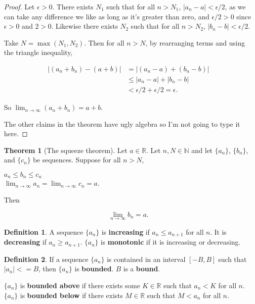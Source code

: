 \documentclass{article}
\theoremstyle{definition}
\newtheorem{definition}{Definition}[section]
\newtheorem{theorem}{Theorem}[section]
\begin{document}
\begin{proof}
Let $\epsilon > 0$. There exists $N_1$ such that for all $n > N_1$, $|a_n - a| < \epsilon/2$, as we can take any difference we like as long as it's greater than zero, and $\epsilon/2 > 0$ since $\epsilon > 0$ and $2 > 0$. Likewise there exists $N_2$ such that for all $n > N_2$, $|b_n - b| < \epsilon/2$.

Take $N = \max(N_1, N_2)$. Then for all $n > N$, by rearranging terms and using the triangle inequality,

\begin{align}
|(a_n + b_n) - (a+b)| & =  |(a_n - a) + (b_n - b)| \\
& \leq  |a_n - a| + |b_n - b| \\
& <  \epsilon/2 + \epsilon/2 = \epsilon.
\end{align}

So $\lim_{n \to \infty} (a_n + b_n) = a + b$.

The other claims in the theorem have ugly algebra so I'm not going to type it here.
\end{proof}

\begin{theorem}[The squeeze theorem] Let $a \in \mathbb{R}$. Let $n, N \in \mathbb{N}$ and let $\{a_n\}$, $\{b_n\}$, and $\{c_n\}$ be sequences. Suppose for all $n > N$,

\begin{center}
$a_n \leq b_n \leq c_n $\\
$\lim_{n \to \infty} a_n = \lim_{n \to \infty} c_n = a$.
\end{center}

Then

\begin{equation}
\lim_{n \to \infty} b_n = a.
\end{equation}

\end{theorem}

\begin{definition}
A sequence $\{a_n\}$ is \textbf{increasing} if $a_n \leq a_{n+1}$ for all $n$. It is \textbf{decreasing} if $a_n \geq a_{n+1}$. $\{a_n\}$ is \textbf{monotonic} if it is increasing or decreasing.
\end{definition}

\begin{definition}
If a sequence $\{a_n\}$ is contained in an interval $[-B, B]$ such that $|a_n| <= B$, then $\{a_n\}$ is \textbf{bounded}. $B$ is a \textbf{bound}.

$\{a_n\}$ is \textbf{bounded above} if there exists some $K \in \mathbb{R}$ such that $a_n < K$ for all $n$. $\{a_n\}$ is \textbf{bounded below} if there exists $M \in \mathbb{R}$ such that $M < a_n$ for all $n$.
\end{definition}
\end{document}
